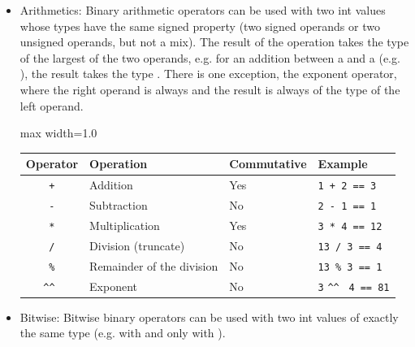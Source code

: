 \begin{itemize}
  \setlength\itemsep{-4pt}
\item Arithmetics: Binary arithmetic operators can be used with two int values
  whose types have the same signed property (two signed operands or two unsigned
  operands, but not a mix). The result of the operation takes the type of the
  largest of the two operands, e.g. for an addition between a  and a
   (e.g. ), the result takes the type
  . There is one exception, the exponent operator, where the right
  operand is always  and the result is always of the type of the
  left operand.

  \begin{center}
    \begin{adjustbox}{max width=1.0\linewidth}
      \begin{tabular}{|c|lll|}
        \hline
        Operator & Operation & Commutative & Example\\[0pt]
        \hline
        \hline
        \texttt{+} & Addition & Yes & \texttt{1 + 2 == 3}\\[0pt]
        \texttt{-} & Subtraction & No & \texttt{2 - 1 == 1}\\[0pt]
        \texttt{*} & Multiplication & Yes & \texttt{3 * 4 == 12}\\[0pt]
        \texttt{/} & Division (truncate) & No & \texttt{13 / 3 == 4}\\[0pt]
        \texttt{\%} & Remainder of the division & No & \texttt{13 \% 3 == 1}\\[0pt]
        \verb~^^~ & Exponent & No & \texttt{3} \verb~^^~ \texttt{4 == 81}\\[0pt]
        \hline
      \end{tabular}
    \end{adjustbox}
  \end{center}

\item Bitwise: Bitwise binary operators can be used with two int values of
  exactly the same type (e.g.  with and only with ).


\end{itemize}
